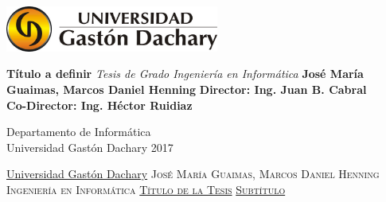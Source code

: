 \documentclass[a4paper,11pt]{report}
\newcommand{\linespacing}{1.5}
\renewcommand{\baselinestretch}{\linespacing}
\begin{document}




\thispagestyle{empty}
\begin{flushright}
\includegraphics[width=7cm]{Img/ugdlogo.jpg}
\end{flushright}	
\vskip40mm
\begin{center}
\huge\textbf{Título a definir}
\vskip2mm
\LARGE\textit{Tesis de Grado Ingeniería en Informática}
\vskip5mm
\Large\textbf{José María Guaimas, Marcos Daniel Henning}
\vskip5mm
\Large\textbf{Director: Ing. Juan B. Cabral}\\
\Large\textbf{Co-Director: Ing. Héctor Ruidiaz}
\normalsize
\end{center}
\vfill
\begin{flushright}
\large
Departamento de Informática \\
Universidad Gastón Dachary 2017\\

\end{flushright}		


	



\thispagestyle{empty}
\newpage
\null\vskip10mm
\begin{center}
\large
\underline{Universidad Gastón Dachary}
\vskip20mm
\textsc{José María Guaimas, Marcos Daniel Henning}\\
\textsc{Ingeniería en Informática}
\vskip20mm
\underline{\textsc{Título de la Tesis}}
\vskip0mm
\underline{\textsc{Subtítulo}}
\vskip20mm
\vskip2mm
\end{center}
\renewcommand{\baselinestretch}{1.0}
\small\normalsize
\end{document}
